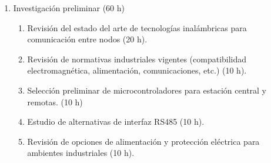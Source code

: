 \documentclass[
11pt, %
]{charter}
\begin{document}
\begin{enumerate}
	\item Investigación preliminar (60 h)
	\begin{enumerate}
		\item Revisión del estado del arte de tecnologías inalámbricas para comunicación entre nodos (20 h).
		\item Revisión de normativas industriales vigentes (compatibilidad electromagnética, alimentación, comunicaciones, etc.) (10 h).
		\item Selección preliminar de microcontroladores para estación central y remotas. (10 h)
		\item Estudio de alternativas de interfaz RS485 (10 h).
		\item Revisión de opciones de alimentación y protección eléctrica para ambientes industriales (10 h).
	\end{enumerate}
	

\end{enumerate}
\end{document}
